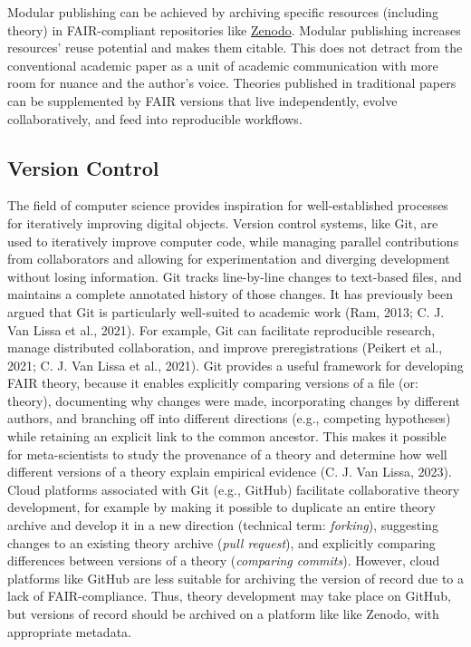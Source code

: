 \documentclass[man]{apa7}
\begin{document}
Modular publishing can be achieved by archiving specific resources (including theory) in FAIR-compliant repositories like \href{https://zenodo.org/}{Zenodo}.
Modular publishing increases resources' reuse potential and makes them citable.
This does not detract from the conventional academic paper as a unit of academic communication with more room for nuance and the author's voice.
Theories published in traditional papers can be supplemented by FAIR versions that live independently, evolve collaboratively, and feed into reproducible workflows.

\subsection{Version Control}\label{version-control}

The field of computer science provides inspiration for well-established processes for iteratively improving digital objects.
Version control systems, like Git, are used to iteratively improve computer code, while managing parallel contributions from collaborators and allowing for experimentation and diverging development without losing information.
Git tracks line-by-line changes to text-based files,
and maintains a complete annotated history of those changes.
It has previously been argued that Git is particularly well-suited to academic work (Ram, 2013; C. J. Van Lissa et al., 2021).
For example, Git can facilitate reproducible research, manage distributed collaboration, and improve preregistrations (Peikert et al., 2021; C. J. Van Lissa et al., 2021).
Git provides a useful framework for developing FAIR theory,
because it enables explicitly comparing versions of a file (or: theory),
documenting why changes were made,
incorporating changes by different authors,
and branching off into different directions (e.g., competing hypotheses) while retaining an explicit link to the common ancestor.
This makes it possible for meta-scientists to study the provenance of a theory and determine how well different versions of a theory explain empirical evidence (C. J. Van Lissa, 2023).
Cloud platforms associated with Git (e.g., GitHub) facilitate collaborative theory development, for example by making it possible to duplicate an entire theory archive and develop it in a new direction (technical term: \emph{forking}),
suggesting changes to an existing theory archive (\emph{pull request}),
and explicitly comparing differences between versions of a theory (\emph{comparing commits}).
However, cloud platforms like GitHub are less suitable for archiving the version of record due to a lack of FAIR-compliance.
Thus, theory development may take place on GitHub, but versions of record should be archived on a platform like like Zenodo, with appropriate metadata.
\end{document}
